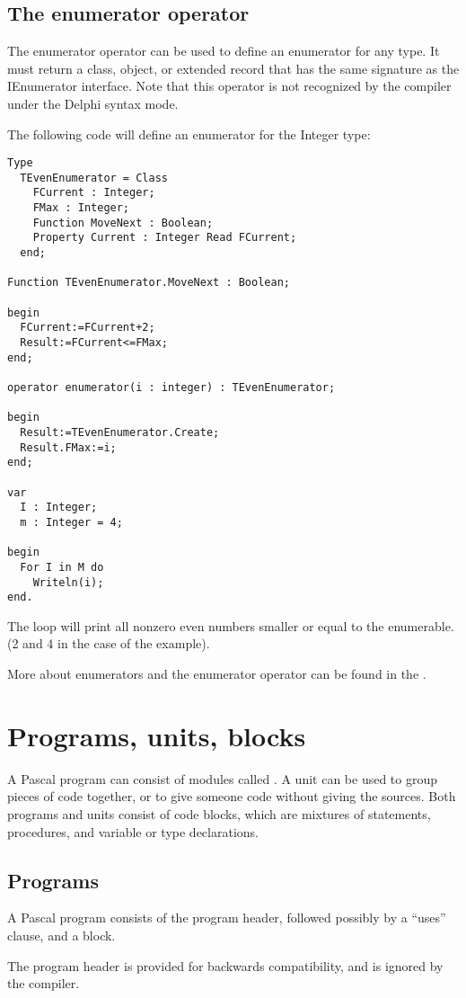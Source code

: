 \section{The enumerator operator}
The enumerator operator can be used to define an enumerator for any type.
It must return a class, object, or extended record that has the same signature as the IEnumerator interface.
Note that this operator is not recognized by the compiler under the Delphi syntax mode.

The following code will define an enumerator for the Integer type:
\begin{verbatim}
Type
  TEvenEnumerator = Class
    FCurrent : Integer;
    FMax : Integer;
    Function MoveNext : Boolean;
    Property Current : Integer Read FCurrent;
  end;

Function TEvenEnumerator.MoveNext : Boolean;

begin
  FCurrent:=FCurrent+2;
  Result:=FCurrent<=FMax;
end;

operator enumerator(i : integer) : TEvenEnumerator;

begin
  Result:=TEvenEnumerator.Create;
  Result.FMax:=i;
end;

var
  I : Integer;
  m : Integer = 4;

begin
  For I in M do
    Writeln(i);
end.
\end{verbatim}

The loop will print all nonzero even numbers smaller or equal to the enumerable. (2 and 4 in the case of the example).

More about enumerators and the enumerator operator can be found in the
.


\chapter{Programs, units, blocks}
A Pascal program can consist of modules called . A unit can be used
to group pieces of code together, or to give someone code without giving
the sources.
Both programs and units consist of code blocks, which are mixtures of
statements, procedures, and variable or type declarations.

\section{Programs}
A Pascal program consists of the program header, followed possibly by a
``uses'' clause, and a block.

The program header is provided for backwards compatibility, and is ignored
by the compiler.

